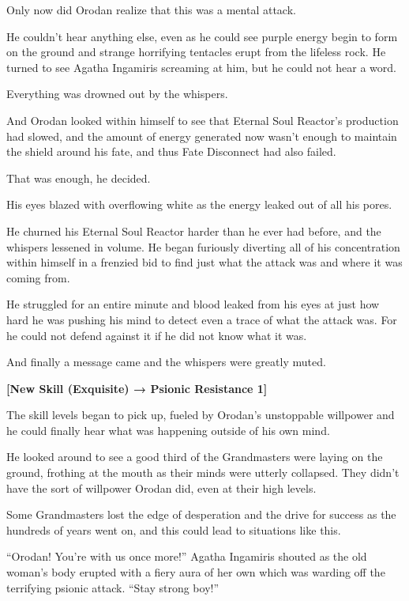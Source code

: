 \documentclass[a4paper,10pt]{book}
\begin{document}
Only now did Orodan realize that this was a mental attack.\par
He couldn’t hear anything else, even as he could see purple energy begin to form on the ground and strange horrifying tentacles erupt from the lifeless rock. He turned to see Agatha Ingamiris screaming at him, but he could not hear a word.\par
Everything was drowned out by the whispers.\par
And Orodan looked within himself to see that Eternal Soul Reactor’s production had slowed, and the amount of energy generated now wasn’t enough to maintain the shield around his fate, and thus Fate Disconnect had also failed.\par
That was enough, he decided.\par
His eyes blazed with overflowing white as the energy leaked out of all his pores.\par
He churned his Eternal Soul Reactor harder than he ever had before, and the whispers lessened in volume. He began furiously diverting all of his concentration within himself in a frenzied bid to find just what the attack was and where it was coming from.\par
He struggled for an entire minute and blood leaked from his eyes at just how hard he was pushing his mind to detect even a trace of what the attack was. For he could not defend against it if he did not know what it was.\par
And finally a message came and the whispers were greatly muted.\par
\textbf{[New Skill (Exquisite) → Psionic Resistance 1]}\par
The skill levels began to pick up, fueled by Orodan’s unstoppable willpower and he could finally hear what was happening outside of his own mind.\par
He looked around to see a good third of the Grandmasters were laying on the ground, frothing at the mouth as their minds were utterly collapsed. They didn’t have the sort of willpower Orodan did, even at their high levels.\par
Some Grandmasters lost the edge of desperation and the drive for success as the hundreds of years went on, and this could lead to situations like this.\par
“Orodan! You’re with us once more!” Agatha Ingamiris shouted as the old woman’s body erupted with a fiery aura of her own which was warding off the terrifying psionic attack. “Stay strong boy!”\par
\end{document}
